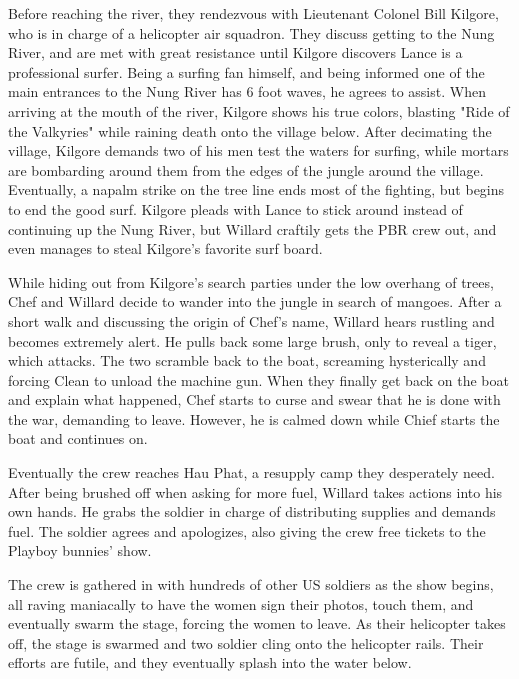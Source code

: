 \documentclass[a4paper,man,natbib]{apa6}
\begin{document}
Before reaching the river, they rendezvous with Lieutenant Colonel Bill Kilgore, who is in charge of a helicopter air squadron. They discuss getting to the Nung River, and are met with great resistance until Kilgore discovers Lance is a professional surfer. Being a surfing fan himself, and being informed one of the main entrances to the Nung River has 6 foot waves, he agrees to assist. When arriving at the mouth of the river, Kilgore shows his true colors, blasting "Ride of the Valkyries" while raining death onto the village below. After decimating the village, Kilgore demands two of his men test the waters for surfing, while mortars are bombarding around them from the edges of the jungle around the village. Eventually, a napalm strike on the tree line ends most of the fighting, but begins to end the good surf. Kilgore pleads with Lance to stick around instead of continuing up the Nung River, but Willard craftily gets the PBR crew out, and even manages to steal Kilgore's favorite surf board.

While hiding out from Kilgore's search parties under the low overhang of trees, Chef and Willard decide to wander into the jungle in search of mangoes. After a short walk and discussing the origin of Chef's name, Willard hears rustling and becomes extremely alert. He pulls back some large brush, only to reveal a tiger, which attacks. The two scramble back to the boat, screaming hysterically and forcing Clean to unload the machine gun. When they finally get back on the boat and explain what happened, Chef starts to curse and swear that he is done with the war, demanding to leave. However, he is calmed down while Chief starts the boat and continues on. 

Eventually the crew reaches Hau Phat, a resupply camp they desperately need. After being brushed off when asking for more fuel, Willard takes actions into his own hands. He grabs the soldier in charge of distributing supplies and demands fuel. The soldier agrees and apologizes, also giving the crew free tickets to the Playboy bunnies' show.

The crew is gathered in with hundreds of other US soldiers as the show begins, all raving maniacally to have the women sign their photos, touch them, and eventually swarm the stage, forcing the women to leave. As their helicopter takes off, the stage is swarmed and two soldier cling onto the helicopter rails. Their efforts are futile, and they eventually splash into the water below.
\end{document}
